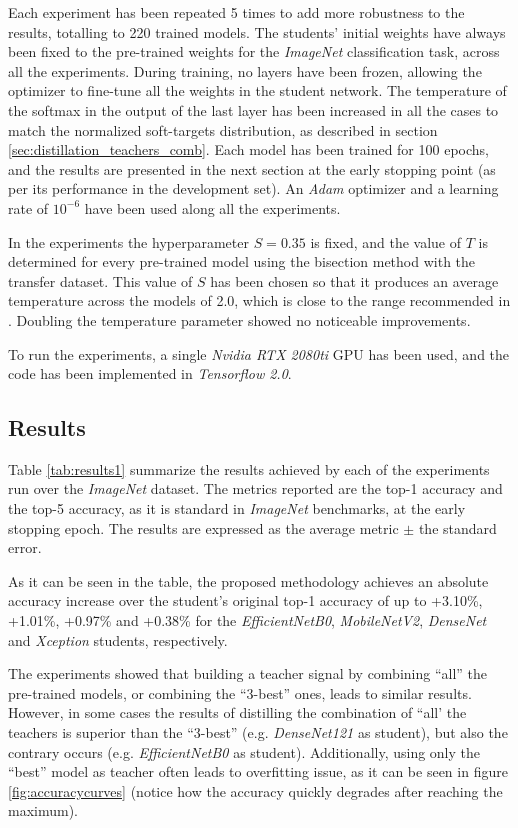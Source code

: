 Each experiment has been repeated 5 times to add more robustness to the results, totalling to 220 trained models. The students' initial weights have always been fixed to the pre-trained weights for the \textit{ImageNet} classification task, across all the experiments. During training, no layers have been frozen, allowing the optimizer to fine-tune all the weights in the student network. The temperature of the softmax in the output of the last layer has been increased in all the cases to match the normalized soft-targets distribution, as described in section \ref{sec:distillation_teachers_comb}.  Each model has been trained for 100 epochs, and the results are presented in the next section at the early stopping point (as per its performance in the development set). An \textit{Adam} optimizer \autocite{kingma14} and a learning rate of $10^{-6}$ have been used along all the experiments.

  In the experiments the hyperparameter $S=0.35$ is fixed, and the value of $T$ is determined for every pre-trained model using the bisection method with the transfer dataset. This value of $S$ has been chosen so that it produces an average temperature across the models of 2.0, which is close to the range recommended in \autocite{hinton2015}. Doubling the temperature parameter showed no noticeable improvements.

  To run the experiments, a single \textit{Nvidia RTX 2080ti} GPU has been used, and the code has been implemented in \textit{Tensorflow 2.0}.

 \subsection{Results}  \label{sec:distillation_results}
 Table \ref{tab:results1} summarize the results achieved by each of the experiments run over the \textit{ImageNet} dataset. The metrics reported are the top-1 accuracy and the top-5 accuracy, as it is standard in \textit{ImageNet} benchmarks, at the early stopping epoch. The results are expressed as the average metric $\pm$ the standard error.

 As it can be seen in the table, the proposed methodology achieves an absolute accuracy increase over the student's original top-1 accuracy of up to +3.10\%, +1.01\%, +0.97\% and +0.38\% for the \textit{EfficientNetB0}, \textit{MobileNetV2},  \textit{DenseNet} and \textit{Xception} students, respectively.
 
The experiments showed that building a teacher signal by combining ``all'' the pre-trained models, or combining the ``3-best'' ones, leads to similar results. However, in some cases the results of distilling the combination of ``all' the teachers is superior than the ``3-best'' (e.g. \textit{DenseNet121} as student), but also the contrary occurs (e.g. \textit{EfficientNetB0} as student). Additionally, using only the ``best'' model as teacher often leads to overfitting issue, as it can be seen in figure \ref{fig:accuracycurves} (notice how the accuracy quickly degrades after reaching the maximum).

